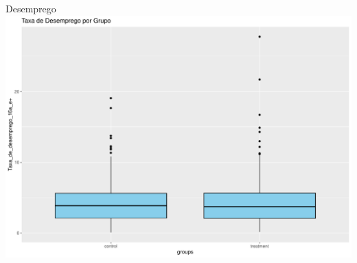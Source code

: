 \documentclass[
  ignorenonframetext,
]{beamer}
\begin{document}
\begin{frame}{Desemprego}
\label{desemprego}
\includegraphics{graficos_files/figure-beamer/unnamed-chunk-12-1.pdf}
\end{frame}
\end{document}
